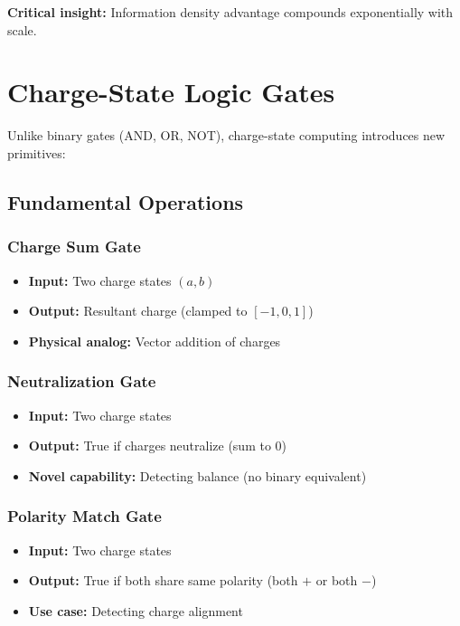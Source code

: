 \documentclass[11pt,a4paper]{article}
\begin{document}
\textbf{Critical insight:} Information density advantage compounds exponentially with scale.

\section{Charge-State Logic Gates}

Unlike binary gates (AND, OR, NOT), charge-state computing introduces new primitives:

\subsection{Fundamental Operations}

\subsubsection{Charge Sum Gate}
\begin{itemize}
\item \textbf{Input:} Two charge states $(a, b)$
\item \textbf{Output:} Resultant charge (clamped to $[-1, 0, 1]$)
\item \textbf{Physical analog:} Vector addition of charges
\end{itemize}

\subsubsection{Neutralization Gate}
\begin{itemize}
\item \textbf{Input:} Two charge states
\item \textbf{Output:} True if charges neutralize (sum to $0$)
\item \textbf{Novel capability:} Detecting balance (no binary equivalent)
\end{itemize}

\subsubsection{Polarity Match Gate}
\begin{itemize}
\item \textbf{Input:} Two charge states
\item \textbf{Output:} True if both share same polarity (both $+$ or both $-$)
\item \textbf{Use case:} Detecting charge alignment
\end{itemize}
\end{document}
